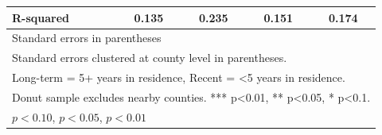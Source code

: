 \begin{table}[htbp]
\begin{tabular}{l*{4}{c}}
R-squared   &       0.135         &       0.235         &       0.151         &       0.174         \\
\hline\hline
\multicolumn{5}{l}{\footnotesize Standard errors in parentheses}\\
\multicolumn{5}{l}{\footnotesize Standard errors clustered at county level in parentheses.}\\
\multicolumn{5}{l}{\footnotesize Long-term = 5+ years in residence, Recent = <5 years in residence.}\\
\multicolumn{5}{l}{\footnotesize Donut sample excludes nearby counties. *** p<0.01, ** p<0.05, * p<0.1.}\\
\multicolumn{5}{l}{\footnotesize \sym{*} \(p<0.10\), \sym{**} \(p<0.05\), \sym{***} \(p<0.01\)}\\
\end{tabular}
\end{table}
